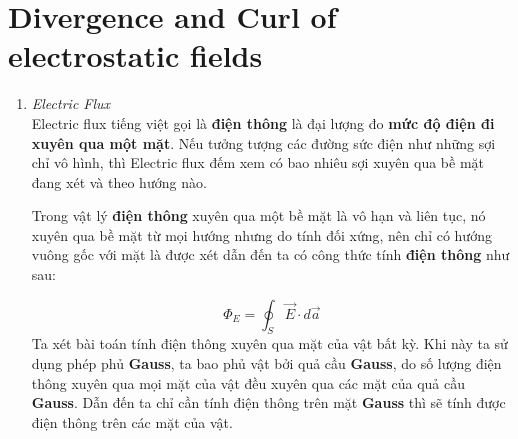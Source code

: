 \section{Divergence and Curl of electrostatic fields}
\begin{enumerate}
    \item \textit{Electric Flux}\\
    Electric flux tiếng việt gọi là \textbf{điện thông} là đại lượng đo \textbf{mức độ điện  đi xuyên qua một mặt}.
Nếu tưởng tượng các đường sức điện như những sợi chỉ vô hình, thì Electric flux đếm xem có bao nhiêu sợi xuyên qua bề mặt đang xét và theo hướng nào.


Trong vật lý \textbf{điện thông} xuyên qua một bề mặt là vô hạn và liên tục, nó xuyên qua bề mặt từ mọi hướng nhưng do tính đối xứng, nên chỉ có hướng vuông gốc với mặt là được xét dẫn đến ta có công thức tính \textbf{điện thông} như sau:

\[
\Phi_E = \oint_{S} \vec{E}\cdot d\vec{a}
\]
Ta xét bài toán tính điện thông xuyên qua mặt của vật bất kỳ. Khi này ta sử dụng phép phủ \textbf{Gauss}, ta bao phủ vật bởi quả cầu \textbf{Gauss}, do số lượng điện thông xuyên qua mọi mặt của vật đều xuyên qua các mặt của quả cầu \textbf{Gauss}. Dẫn đến ta chỉ cần tính điện thông trên mặt \textbf{Gauss} thì sẽ tính được điện thông trên các mặt của vật.



\end{enumerate}
